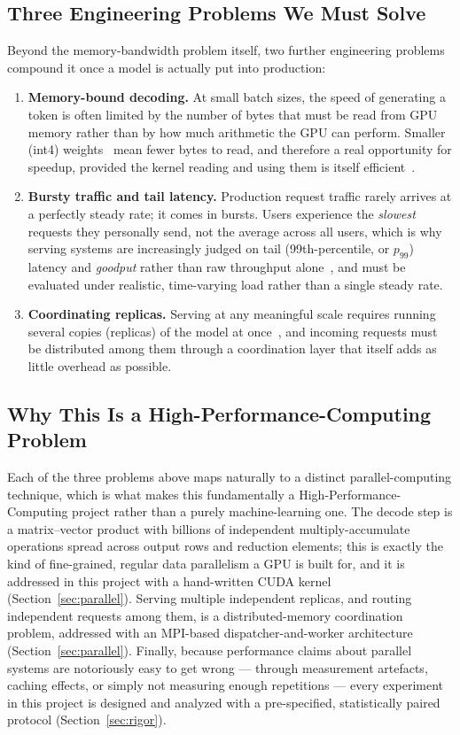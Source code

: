 \documentclass[11pt,a4paper]{article}
\begin{document}
\subsection{Three Engineering Problems We Must Solve}
Beyond the memory-bandwidth problem itself, two further engineering problems compound it once a model is actually put
into production:
\begin{enumerate}[leftmargin=1.5em, itemsep=6pt]
  \item \textbf{Memory-bound decoding.} At small batch sizes, the speed of generating a token is often limited by the
        number of bytes that must be read from GPU memory rather than by how much arithmetic the GPU can perform.
        Smaller (int4) weights~\cite{awq,gptq} mean fewer bytes to read, and therefore a real opportunity for
        speedup, provided the kernel reading and using them is itself efficient~\cite{marlin}.
  \item \textbf{Bursty traffic and tail latency.} Production request traffic rarely arrives at a perfectly steady
        rate; it comes in bursts. Users experience the \emph{slowest} requests they personally send, not the average
        across all users, which is why serving systems are increasingly judged on tail (99th-percentile, or $p_{99}$)
        latency and \emph{goodput} rather than raw throughput alone~\cite{distserve,splitwise}, and must be evaluated
        under realistic, time-varying load rather than a single steady rate.
  \item \textbf{Coordinating replicas.} Serving at any meaningful scale requires running several copies (replicas) of
        the model at once~\cite{orca,vllm}, and incoming requests must be distributed among them through a
        coordination layer that itself adds as little overhead as possible.
\end{enumerate}

\subsection{Why This Is a High-Performance-Computing Problem}
Each of the three problems above maps naturally to a distinct parallel-computing technique, which is what makes this
fundamentally a High-Performance-Computing project rather than a purely machine-learning one. The decode step is a
matrix--vector product with billions of independent multiply-accumulate operations spread across output rows and
reduction elements; this is exactly the kind of fine-grained, regular data parallelism a GPU is built for, and it is
addressed in this project with a hand-written CUDA kernel (Section~\ref{sec:parallel}). Serving multiple independent
replicas, and routing independent requests among them, is a distributed-memory coordination problem, addressed with
an MPI-based dispatcher-and-worker architecture (Section~\ref{sec:parallel}). Finally, because performance claims
about parallel systems are notoriously easy to get wrong --- through measurement artefacts, caching effects, or
simply not measuring enough repetitions --- every experiment in this project is designed and analyzed with a
pre-specified, statistically paired protocol \cite{georges,hoefler} (Section~\ref{sec:rigor}).
\end{document}
